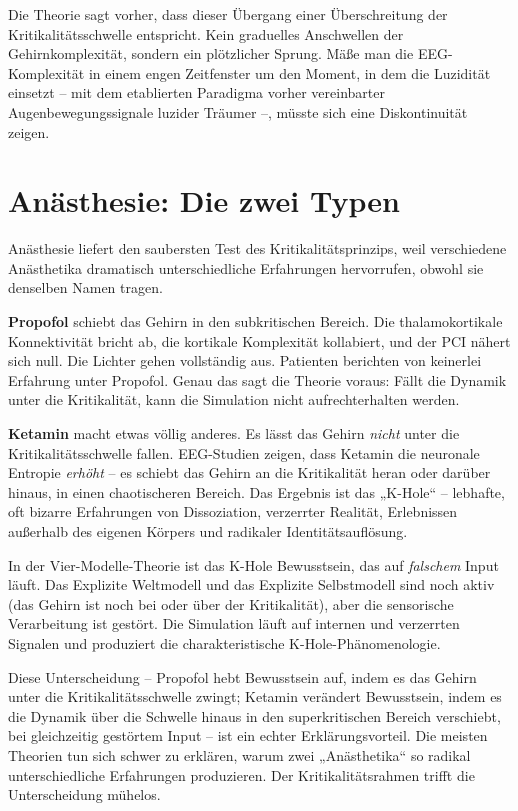 \documentclass[11pt, twoside, openright]{book}
\begin{document}
Die Theorie sagt vorher, dass dieser Übergang einer Überschreitung der Kritikalitätsschwelle entspricht. Kein graduelles Anschwellen der Gehirnkomplexität, sondern ein plötzlicher Sprung. Mäße man die EEG-Komplexität in einem engen Zeitfenster um den Moment, in dem die Luzidität einsetzt -- mit dem etablierten Paradigma vorher vereinbarter Augenbewegungssignale luzider Träumer --, müsste sich eine Diskontinuität zeigen.

\section*{Anästhesie: Die zwei Typen}

Anästhesie liefert den saubersten Test des Kritikalitätsprinzips, weil verschiedene Anästhetika dramatisch unterschiedliche Erfahrungen hervorrufen, obwohl sie denselben Namen tragen.

\textbf{Propofol} schiebt das Gehirn in den subkritischen Bereich. Die thalamokortikale Konnektivität bricht ab, die kortikale Komplexität kollabiert, und der PCI nähert sich null. Die Lichter gehen vollständig aus. Patienten berichten von keinerlei Erfahrung unter Propofol. Genau das sagt die Theorie voraus: Fällt die Dynamik unter die Kritikalität, kann die Simulation nicht aufrechterhalten werden.

\textbf{Ketamin} macht etwas völlig anderes. Es lässt das Gehirn \textit{nicht} unter die Kritikalitätsschwelle fallen. EEG-Studien zeigen, dass Ketamin die neuronale Entropie \textit{erhöht} -- es schiebt das Gehirn an die Kritikalität heran oder darüber hinaus, in einen chaotischeren Bereich. Das Ergebnis ist das „K-Hole“ -- lebhafte, oft bizarre Erfahrungen von Dissoziation, verzerrter Realität, Erlebnissen außerhalb des eigenen Körpers und radikaler Identitätsauflösung.

In der Vier-Modelle-Theorie ist das K-Hole Bewusstsein, das auf \textit{falschem} Input läuft. Das Explizite Weltmodell und das Explizite Selbstmodell sind noch aktiv (das Gehirn ist noch bei oder über der Kritikalität), aber die sensorische Verarbeitung ist gestört. Die Simulation läuft auf internen und verzerrten Signalen und produziert die charakteristische K-Hole-Phänomenologie.

Diese Unterscheidung -- Propofol hebt Bewusstsein auf, indem es das Gehirn unter die Kritikalitätsschwelle zwingt; Ketamin verändert Bewusstsein, indem es die Dynamik über die Schwelle hinaus in den superkritischen Bereich verschiebt, bei gleichzeitig gestörtem Input -- ist ein echter Erklärungsvorteil. Die meisten Theorien tun sich schwer zu erklären, warum zwei „Anästhetika“ so radikal unterschiedliche Erfahrungen produzieren. Der Kritikalitätsrahmen trifft die Unterscheidung mühelos.
\end{document}
